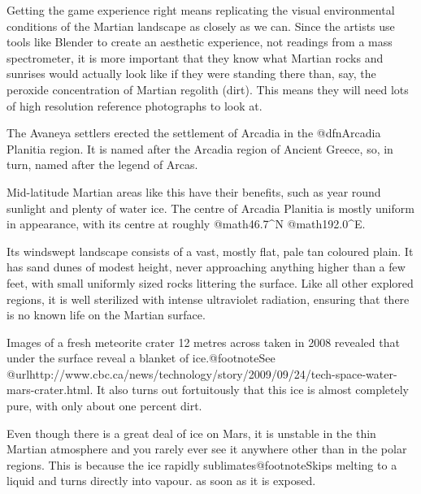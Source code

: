 


Getting the game experience right means replicating the visual environmental conditions of the Martian landscape as closely as we can. Since the artists use tools like Blender to create an aesthetic experience, not readings from a mass spectrometer, it is more important that they know what Martian rocks and sunrises would actually look like if they were standing there than, say, the peroxide concentration of Martian regolith (dirt). This means they will need lots of high resolution reference photographs to look at.

The Avaneya settlers erected the settlement of Arcadia in the @dfn{Arcadia Planitia} region. It is named after the Arcadia region of Ancient Greece, so, in turn, named after the legend of Arcas. 

Mid-latitude Martian areas like this have their benefits, such as year round sunlight and plenty of water ice. The centre of Arcadia Planitia is mostly uniform in appearance, with its centre at roughly @math{46.7^{\circ}}N @math{192.0^{\circ}}E.

Its windswept landscape consists of a vast, mostly flat, pale tan coloured plain. It has sand dunes of modest height, never approaching anything higher than a few feet, with small uniformly sized rocks littering the surface. Like all other explored regions, it is well sterilized with intense ultraviolet radiation, ensuring that there is no known life on the Martian surface.

Images of a fresh meteorite crater 12 metres across taken in 2008 revealed that under the surface reveal a blanket of ice.@footnote{See @url{http://www.cbc.ca/news/technology/story/2009/09/24/tech-space-water-mars-crater.html}.} It also turns out fortuitously that this ice is almost completely pure, with only about one percent dirt.

Even though there is a great deal of ice on Mars, it is unstable in the thin Martian atmosphere and you rarely ever see it anywhere other than in the polar regions. This is because the ice rapidly sublimates@footnote{Skips melting to a liquid and turns directly into vapour.} as soon as it is exposed.

